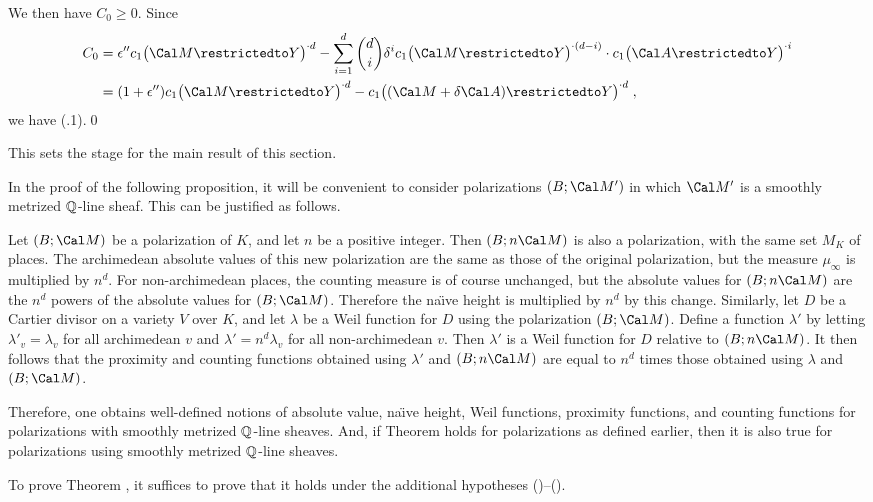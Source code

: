 We then have $C_0\ge0$.  Since
$$\split C_0 &= \epsilon'' c_1\bigl(\Cal M\restrictedto Y\bigr)^{\cdot d}
    - \sum_{i=1}^d \binom di \delta^i
      c_1\bigl(\Cal M\restrictedto Y\bigr)^{\cdot(d-i)}
      \cdot c_1\bigl(\Cal A\restrictedto Y\bigr)^{\cdot i} \\
  &= (1+\epsilon'') c_1\bigl(\Cal M\restrictedto Y\bigr)^{\cdot d}
    - c_1\bigl((\Cal M+\delta\Cal A)\restrictedto Y\bigr)^{\cdot d}
  \;,\endsplit$$
we have (.1).\qed
\enddemo

This sets the stage for the main result of this section.

  In the proof of the following proposition, it will be convenient
to consider polarizations $(B;\Cal M')$ in which $\Cal M'$ is
a smoothly metrized $\Bbb Q$\snug-line sheaf.  This can be justified as follows.

Let $(B;\Cal M)$ be a polarization of $K$, and let $n$ be a positive integer.
Then $(B;n\Cal M)$ is also a polarization, with the same set $M_K$ of places.
The archimedean absolute values of this new polarization are the same
as those of the original polarization, but the measure $\mu_\infty$
is multiplied by $n^d$.  For non-archimedean places, the counting measure is
of course unchanged, but the absolute values for $(B;n\Cal M)$ are
the $n^d$ powers of the absolute values for $(B;\Cal M)$.
Therefore the na\"{\i}ve height is multiplied by $n^d$ by this change.
Similarly, let $D$ be a Cartier divisor on a variety $V$ over $K$, and let
$\lambda$ be a Weil function for $D$ using the polarization $(B;\Cal M)$.
Define a function $\lambda'$ by letting $\lambda'_v=\lambda_v$ for all
archimedean $v$ and $\lambda'=n^d\lambda_v$ for all non-archimedean $v$.
Then $\lambda'$ is a Weil function for $D$ relative to $(B;n\Cal M)$.
It then follows that the proximity and counting functions obtained
using $\lambda'$ and $(B;n\Cal M)$ are equal to $n^d$ times those obtained
using $\lambda$ and $(B;\Cal M)$.

Therefore, one obtains well-defined notions of absolute value,
na\"{\i}ve height, Weil functions, proximity functions, and counting functions
for polarizations with smoothly metrized $\Bbb Q$\snug-line sheaves.
And, if Theorem  holds for polarizations as defined earlier, then
it is also true for polarizations using smoothly metrized
$\Bbb Q$\snug-line sheaves.
\endit

  To prove Theorem , it suffices to prove that it holds
under the additional hypotheses ()--().
\endit

